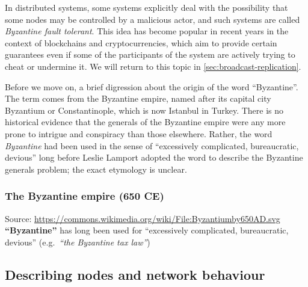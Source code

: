 In distributed systems, some systems explicitly deal with the possibility that some nodes may be controlled by a malicious actor, and such systems are called \emph{Byzantine fault tolerant}.
This idea has become popular in recent years in the context of blockchains and cryptocurrencies, which aim to provide certain guarantees even if some of the participants of the system are actively trying to cheat or undermine it.
We will return to this topic in \autoref{sec:broadcast-replication}.

Before we move on, a brief digression about the origin of the word ``Byzantine''.
The term comes from the Byzantine empire, named after its capital city Byzantium or Constantinople, which is now Istanbul in Turkey.
There is no historical evidence that the generals of the Byzantine empire were any more prone to intrigue and conspiracy than those elsewhere.
Rather, the word \emph{Byzantine} had been used in the sense of ``excessively complicated, bureaucratic, devious'' long before Leslie Lamport adopted the word to describe the Byzantine generals problem; the exact etymology is unclear.

\pagebreak[3]
\begin{frame}
    \label{s:byzantine-empire}
    \frametitle{The Byzantine empire (650 CE)}
    {\scriptsize Source: \url{https://commons.wikimedia.org/wiki/File:Byzantiumby650AD.svg}}\\[1em]
    \textbf{``Byzantine''} has long been used for ``excessively complicated, bureaucratic, devious'' (e.g.\ \emph{``the Byzantine tax law''})
\end{frame}
\label{l:byzantine-empire}

\subsection{Describing nodes and network behaviour}\label{sec:system-behaviour}

